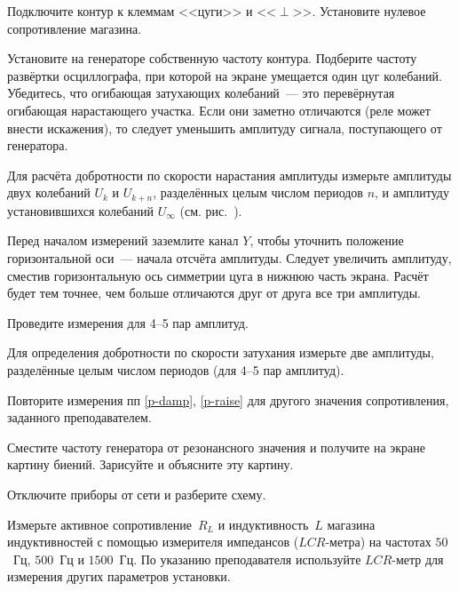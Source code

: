 \begin{lab:task}
	\item Подключите контур к клеммам <<цуги>> и <<$\perp$>>. 
    Установите нулевое сопротивление магазина.

	\item Установите на генераторе собственную частоту контура. Подберите частоту 
    развёртки осциллографа, при которой на экране умещается один цуг колебаний. 
    Убедитесь, что огибающая затухающих колебаний~--- это перевёрнутая огибающая 
    нарастающего участка. Если они заметно отличаются (реле может внести искажения), 
    то следует уменьшить амплитуду сигнала, поступающего от генератора.

	\item \label{p-damp} Для расчёта добротности по скорости нарастания амплитуды измерьте
амплитуды двух колебаний $U_k$ и $U_{k+n}$, разделённых целым числом периодов $n$,
и амплитуду установившихся колебаний $U_{\infty}$ 
(см. рис.~).

Перед началом измерений заземлите канал $Y$, чтобы уточнить положение 
горизонтальной оси~--- начала отсчёта амплитуды. 
Следует увеличить амплитуду, сместив горизонтальную ось симметрии цуга в нижнюю часть 
экрана. Расчёт будет тем точнее, чем больше отличаются друг от друга все 
три амплитуды.

Проведите измерения для 4--5 пар амплитуд.

	\item \label{p-raise} Для определения добротности по скорости затухания измерьте две
амплитуды, разделённые целым числом периодов (для 4--5 пар амплитуд).

	\item Повторите измерения пп \ref{p-damp}, \ref{p-raise} для другого 
    значения сопротивления, заданного преподавателем.

	\item Сместите частоту генератора от резонансного значения и получите на
экране картину биений. Зарисуйте и объясните эту картину.

	\item Отключите приборы от сети и разберите схему.

	\item Измерьте активное сопротивление~$R_L$ и индуктивность~$L$ магазина
индуктивностей с помощью измерителя импедансов ($LCR$-метра) 
на частотах $50$~Гц, $500$~Гц и $1500$~Гц. По указанию преподавателя 
используйте $LCR$-метр для измерения других параметров установки.



\end{lab:task}
